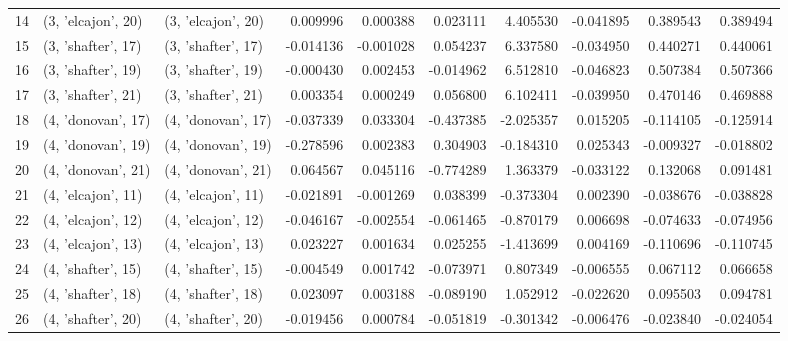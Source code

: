 \begin{tabular}{lllrrrrrrr}
14 &  (3, 'elcajon', 20) &  (3, 'elcajon', 20) &  0.009996 &   0.000388 &  0.023111 &   4.405530 & -0.041895 &   0.389543 &  0.389494 \\
15 &  (3, 'shafter', 17) &  (3, 'shafter', 17) & -0.014136 &  -0.001028 &  0.054237 &   6.337580 & -0.034950 &   0.440271 &  0.440061 \\
16 &  (3, 'shafter', 19) &  (3, 'shafter', 19) & -0.000430 &   0.002453 & -0.014962 &   6.512810 & -0.046823 &   0.507384 &  0.507366 \\
17 &  (3, 'shafter', 21) &  (3, 'shafter', 21) &  0.003354 &   0.000249 &  0.056800 &   6.102411 & -0.039950 &   0.470146 &  0.469888 \\
18 &  (4, 'donovan', 17) &  (4, 'donovan', 17) & -0.037339 &   0.033304 & -0.437385 &  -2.025357 &  0.015205 &  -0.114105 & -0.125914 \\
19 &  (4, 'donovan', 19) &  (4, 'donovan', 19) & -0.278596 &   0.002383 &  0.304903 &  -0.184310 &  0.025343 &  -0.009327 & -0.018802 \\
20 &  (4, 'donovan', 21) &  (4, 'donovan', 21) &  0.064567 &   0.045116 & -0.774289 &   1.363379 & -0.033122 &   0.132068 &  0.091481 \\
21 &  (4, 'elcajon', 11) &  (4, 'elcajon', 11) & -0.021891 &  -0.001269 &  0.038399 &  -0.373304 &  0.002390 &  -0.038676 & -0.038828 \\
22 &  (4, 'elcajon', 12) &  (4, 'elcajon', 12) & -0.046167 &  -0.002554 & -0.061465 &  -0.870179 &  0.006698 &  -0.074633 & -0.074956 \\
23 &  (4, 'elcajon', 13) &  (4, 'elcajon', 13) &  0.023227 &   0.001634 &  0.025255 &  -1.413699 &  0.004169 &  -0.110696 & -0.110745 \\
24 &  (4, 'shafter', 15) &  (4, 'shafter', 15) & -0.004549 &   0.001742 & -0.073971 &   0.807349 & -0.006555 &   0.067112 &  0.066658 \\
25 &  (4, 'shafter', 18) &  (4, 'shafter', 18) &  0.023097 &   0.003188 & -0.089190 &   1.052912 & -0.022620 &   0.095503 &  0.094781 \\
26 &  (4, 'shafter', 20) &  (4, 'shafter', 20) & -0.019456 &   0.000784 & -0.051819 &  -0.301342 & -0.006476 &  -0.023840 & -0.024054 \\
\bottomrule
\end{tabular}
